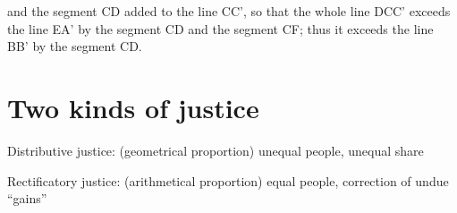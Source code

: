 \begin{example}
                    \vspace{1em}

                    and the segment CD added to the line CC', so that the whole line DCC' exceeds the line EA' by the segment CD and the segment CF; thus it exceeds the line BB' by the segment CD.

                    \begin{center}
                    \end{center}
                    
                \end{example}

        \section{Two kinds of justice}

            \begin{definition}
                Distributive justice: (geometrical proportion) unequal people, unequal share
            \end{definition}

            \begin{definition}
                Rectificatory justice: (arithmetical proportion) equal people, correction of undue “gains”
            \end{definition}

